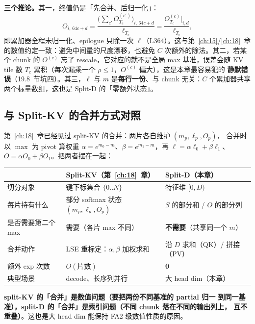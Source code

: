 \textbf{三个推论。}其一，终值仍是「先合并、后归一化」：
\begin{equation}
  O_{i,\,64c+d} = \frac{\bigl(\sum_{c'} O^{(c')}_{T_c}\bigr)_{i,\,64c+d}}{\ell_{T_c}}
  = \frac{O^{(c)}_{T_c}\big|_{i,d}}{\ell_{T_c}} ,
  \label{eq:19-final}
\end{equation}
即累加器全程未归一化、epilogue 只除一次 $\ell$（L364）。这与第~\ref{ch:15}/\ref{ch:18}~章
的数值约定一致：避免中间量的尺度漂移，也避免 $C$ 次额外的除法。其二，若某个 chunk
的 $O^{(c)}$ 忘了 rescale，它对应的就不是全局 max 基准，误差会随 KV tile 数
$T_c$ 累积（每次漏乘一个 $\rho \le 1$，$O^{(c)}$ 偏大），这是本章最容易犯的
\textbf{静默错误}（19.8~节坑四）。其三，$\ell$ 与 $m$ 是\textbf{每行一份}、与 chunk
无关：$C$ 个累加器共享两个标量数组，这也是 Split-D 的「零额外状态」。

\subsection{与 Split-KV 的合并方式对照}

第~\ref{ch:18}~章已经见过 split-KV 的合并：两片各自维护 $(m_p, \ell_p, O_p)$，
合并时以 $\max$ 为 pivot 算权重 $\alpha = e^{m_0-m}$、$\beta = e^{m_1-m}$，再
$\ell = \alpha \ell_0 + \beta \ell_1$、$O = \alpha O_0 + \beta O_1$。把两者摆在一起：

\begin{center}
\begin{tabular}{lll}
\toprule
 & \textbf{Split-KV}（第~\ref{ch:18}~章） & \textbf{Split-D}（本章） \\
\midrule
切分对象 & 键下标集合 $\{0..N\}$ & 特征维 $[0, D)$ \\
每片持有什么 & 部分 softmax 状态 $(m_p,\ell_p,O_p)$ & $S$ 的部分和 / $O$ 的部分列 \\
是否需要第二个 max & 需要（各片 max 不同） & \textbf{不需要}（共享同一个 $m$） \\
合并动作 & LSE 重标定：$\alpha,\beta$ 加权求和 & 沿 $D$ 求和（QK）/ 拼接（PV） \\
额外 exp 次数 & $O(\text{片数})$ & \textbf{0} \\
典型场景 & decode、长序列并行 & 大 head dim（本章） \\
\bottomrule
\end{tabular}
\end{center}

\textbf{split-KV 的「合并」是数值问题（要把两份不同基准的 partial 归一
到同一基准），split-D 的「合并」是索引问题（不同 chunk 落在不同的输出列上，
互不重叠）}。这也是大 head dim 能保持 FA2 级数值性质的原因。

